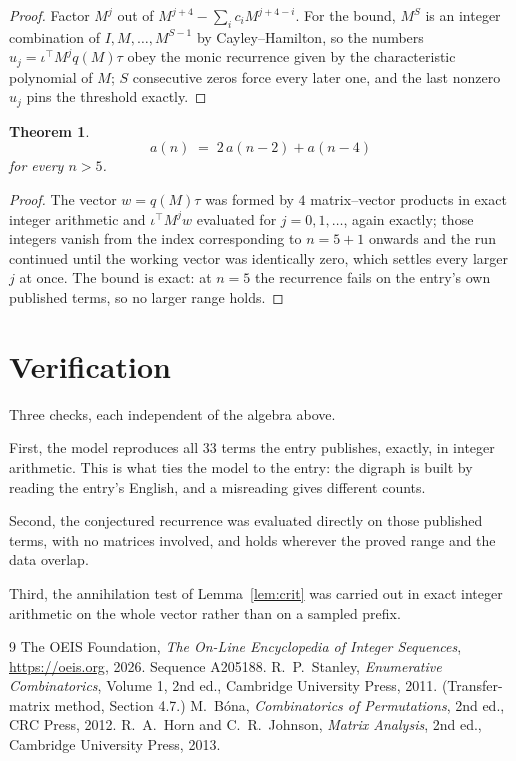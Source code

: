 \documentclass[11pt,a4paper]{article}
\theoremstyle{plain}
\newtheorem{theorem}{Theorem}
\theoremstyle{definition}
\begin{document}
\begin{proof}
Factor $M^{j}$ out of $M^{j+4}-\sum_ic_iM^{j+4-i}$. For the bound, $M^{S}$
is an integer combination of $I,M,\dots,M^{S-1}$ by Cayley--Hamilton, so the numbers
$u_j=\iota^{\!\top}M^{j}q(M)\tau$ obey the monic recurrence given by the characteristic
polynomial of $M$; $S$ consecutive zeros force every later one, and the last nonzero $u_j$
pins the threshold exactly.
\end{proof}

\begin{theorem}
\[
a(n)\;=\;2\,a(n-2) + a(n-4)
\]
for every $n>5$.
\end{theorem}

\begin{proof}
The vector $w=q(M)\tau$ was formed by $4$ matrix--vector products in exact integer
arithmetic and $\iota^{\!\top}M^{j}w$ evaluated for $j=0,1,\dots$, again exactly; those
integers vanish from the index corresponding to $n=5+1$ onwards and the run continued
until the working vector was identically zero, which settles every larger $j$ at once. The bound is exact: at $n=5$ the recurrence fails on the entry's own published terms, so no larger range holds.
\end{proof}

\section{Verification}

Three checks, each independent of the algebra above.

First, the model reproduces all $33$ terms the entry publishes, exactly, in integer
arithmetic. This is what ties the model to the entry: the digraph is built by reading the
entry's English, and a misreading gives different counts.

Second, the conjectured recurrence was evaluated directly on those published terms, with no
matrices involved, and holds wherever the proved range and the data overlap.

Third, the annihilation test of Lemma~\ref{lem:crit} was carried out in exact integer
arithmetic on the whole vector rather than on a sampled prefix.

\begin{thebibliography}{9}
 The OEIS Foundation, \emph{The On-Line Encyclopedia of Integer
Sequences}, \url{https://oeis.org}, 2026. Sequence A205188.
 R.~P.~Stanley, \emph{Enumerative Combinatorics}, Volume 1, 2nd ed.,
Cambridge University Press, 2011. (Transfer-matrix method, Section 4.7.)
 M.~B\'ona, \emph{Combinatorics of Permutations}, 2nd ed., CRC
Press, 2012.
 R.~A.~Horn and C.~R.~Johnson, \emph{Matrix Analysis}, 2nd ed., Cambridge
University Press, 2013.
\end{thebibliography}
\end{document}
